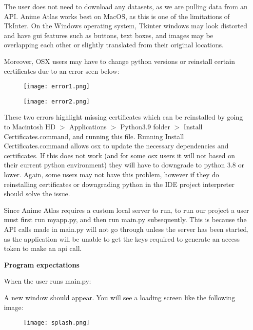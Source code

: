 \documentclass[fontsize=11pt]{article}
\begin{document}
\item[]The user does not need to download any datasets, as we are pulling data from an API. Anime Atlas works best on MacOS, as this is one of the limitations of TkInter. On the Windows operating system, Tkinter windows may look distorted and have gui features such as buttons, text boxes, and images may be overlapping each other or slightly translated from their original locations. \\

\newpage
\item[]Moreover, OSX users may have to change python versions or reinstall certain certificates due to an error seen below:

\begin{figure}[htp]
    \centering
    \texttt{[image: error1.png]}
\end{figure}
\begin{figure}[htp]
    \centering
    \texttt{[image: error2.png]}
\end{figure}

These two errors highlight missing certificates which can be reinstalled by going to Macintosh HD $>$ Applications $>$ Python3.9 folder $>$ Install Certificates.command, and running this file. Running Install Certificates.command allows osx to update the necessary dependencies and certificates. If this does not work (and for some osx users it will not based on their current python environment) they will have to downgrade to python 3.8 or lower. Again, some users may not have this problem, however if they do reinstalling certificates or downgrading python in the IDE project interpreter should solve the issue. \\

\item[]Since Anime Atlas requires a custom local server to run, to run our project a user must first run myapp.py, and then run main.py subsequently. This is because the API calls made in main.py will not go through unless the server has been started, as the application will be unable to get the keys required to generate an access token to make an api call. 

\newpage
\textbf{Program expectations}
\item[]When the user runs main.py:

\item[] A new window should appear. You will see a loading screen like the following image:
\begin{figure}[htp]
    \centering
    \texttt{[image: splash.png]}
\end{figure}
\end{document}
